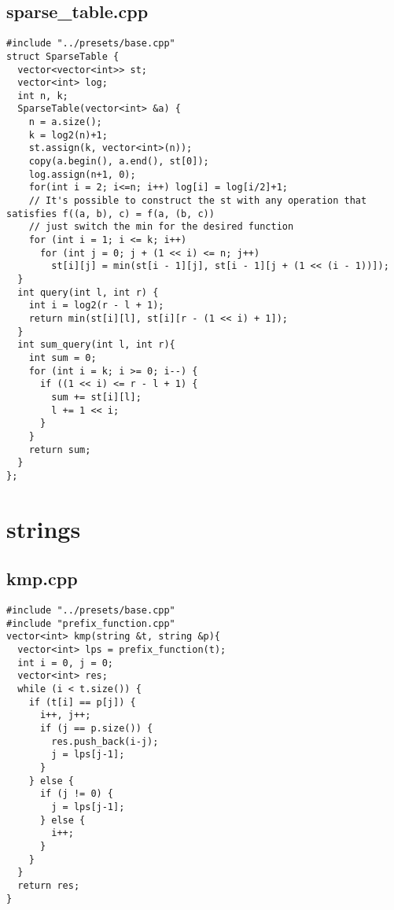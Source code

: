 \documentclass[11pt,landscape,twocolumn]{article}
\begin{document}
\subsection*{sparse\_table.cpp}
\begin{lstlisting}
#include "../presets/base.cpp"
struct SparseTable {
  vector<vector<int>> st;
  vector<int> log;
  int n, k;
  SparseTable(vector<int> &a) {
    n = a.size();
    k = log2(n)+1;
    st.assign(k, vector<int>(n));
    copy(a.begin(), a.end(), st[0]);
    log.assign(n+1, 0);
    for(int i = 2; i<=n; i++) log[i] = log[i/2]+1;
    // It's possible to construct the st with any operation that satisfies f((a, b), c) = f(a, (b, c))
    // just switch the min for the desired function
    for (int i = 1; i <= k; i++)
      for (int j = 0; j + (1 << i) <= n; j++)
        st[i][j] = min(st[i - 1][j], st[i - 1][j + (1 << (i - 1))]);
  }
  int query(int l, int r) {
    int i = log2(r - l + 1);
    return min(st[i][l], st[i][r - (1 << i) + 1]);
  }
  int sum_query(int l, int r){
    int sum = 0;
    for (int i = k; i >= 0; i--) {
      if ((1 << i) <= r - l + 1) {
        sum += st[i][l];
        l += 1 << i;
      }
    }
    return sum;
  }
};
\end{lstlisting}

\section{strings}
\subsection*{kmp.cpp}
\begin{lstlisting}
#include "../presets/base.cpp"
#include "prefix_function.cpp"
vector<int> kmp(string &t, string &p){
  vector<int> lps = prefix_function(t);
  int i = 0, j = 0;
  vector<int> res;
  while (i < t.size()) {
    if (t[i] == p[j]) {
      i++, j++;
      if (j == p.size()) {
        res.push_back(i-j);
        j = lps[j-1];
      }
    } else {
      if (j != 0) {
        j = lps[j-1];
      } else {
        i++;
      }
    }
  }
  return res;
}
\end{lstlisting}
\end{document}
